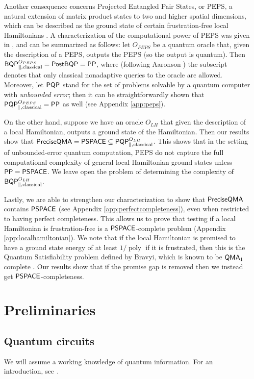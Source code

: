 \documentclass[11pt]{article}
\theoremstyle{definition}
\theoremstyle{remark}
\newcommand\QMA{{\sf{QMA}}}
\newcommand\PSPACE{{\sf{PSPACE}}}
\newcommand\PP{\sf{PP}}
\newcommand\BQP{{\sf{BQP}}}
\newcommand\PostBQP{{\sf{PostBQP}}}
\newcommand\PQP{{\sf{PQP}}}
\newcommand\preciseQMA{{\sf{PreciseQMA}}}
\DeclareMathOperator{\poly}{poly}
\begin{document}
Another consequence concerns Projected Entangled Pair States, or PEPS, a natural extension of matrix product states to two and higher spatial dimensions, which can be described as the ground state of certain frustration-free local Hamiltonians \cite{vc04}. A characterization of the computational power of PEPS was given in \cite{swv07}, and can be summarized as follows: let $O_{PEPS}$ be a quantum oracle that, given the description of a PEPS, outputs the PEPS (so the output is quantum). Then $\BQP^{O_{PEPS}}_{\parallel,\text{classical}} = \PostBQP = \PP$, where (following Aaronson \cite{aaronson05}) the subscript  denotes that only classical nonadaptive queries to the oracle are allowed. Moreover, let $\PQP$ stand for the set of problems solvable by a quantum computer with \emph{unbounded error}; then it can be straightforwardly shown that $\PQP^{O_{PEPS}}_{\parallel,\text{classical}} = \PP$ as well (see Appendix \ref{app:peps}).

On the other hand, suppose we have an oracle $O_{LH}$ that given the description of a local Hamiltonian, outputs a ground state of the Hamiltonian. Then our results show that $\preciseQMA = \PSPACE \subseteq \PQP^{O_{LH}}_{\parallel,\text{classical}}$. This shows that in the setting of unbounded-error quantum computation, PEPS do not capture the full computational complexity of general local Hamiltonian ground states unless $\PP=\PSPACE$. We leave open the problem of determining the complexity of $\BQP^{O_{LH}}_{\parallel,\text{classical}}$.

Lastly, we are able to strengthen our characterization to show that $\preciseQMA$ contains $\PSPACE$ (see Appendix \ref{app:perfectcompleteness}), even when restricted to having perfect completeness.  This allows us to prove that testing if a local Hamiltonian is frustration-free is a $\PSPACE$-complete problem (Appendix \ref{app:localhamiltonian}). We note that if the local Hamiltonian is promised to have a ground state energy of at least $1/\poly$ if it is frustrated, then this is the Quantum Satisfiability problem defined by Bravyi, which is known to be $\QMA_1$ complete \cite{bravyi06,gn13}. Our results show that if the promise gap is removed then we instead get $\PSPACE$-completeness.

 \section{Preliminaries}
\subsection{Quantum circuits}
We will assume a working knowledge of quantum information. For an introduction, see \cite{nc00}.
\end{document}

